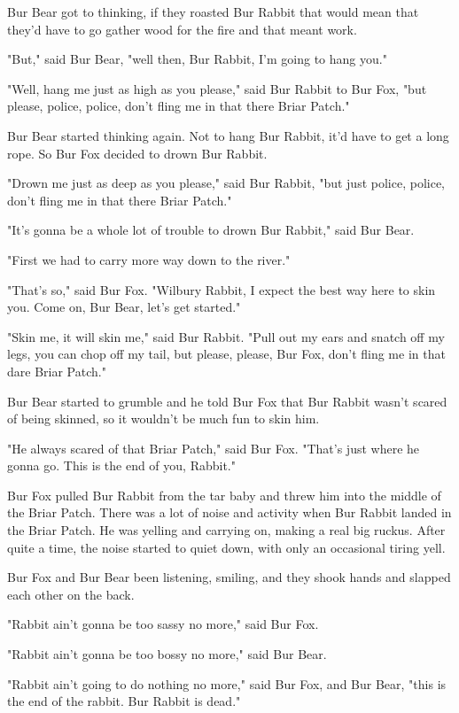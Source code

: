 Bur Bear got to thinking, if they roasted Bur Rabbit that would mean that they'd have to go gather wood for the fire and that meant work.

"But," said Bur Bear, "well then, Bur Rabbit, I'm going to hang you."

"Well, hang me just as high as you please," said Bur Rabbit to Bur Fox, "but please, police, police, don't fling me in that there Briar Patch."

Bur Bear started thinking again. Not to hang Bur Rabbit, it'd have to get a long rope. So Bur Fox decided to drown Bur Rabbit.

"Drown me just as deep as you please," said Bur Rabbit, "but just police, police, don't fling me in that there Briar Patch."

"It's gonna be a whole lot of trouble to drown Bur Rabbit," said Bur Bear.

"First we had to carry more way down to the river."

"That's so," said Bur Fox. "Wilbury Rabbit, I expect the best way here to skin you. Come on, Bur Bear, let's get started."

"Skin me, it will skin me," said Bur Rabbit. "Pull out my ears and snatch off my legs, you can chop off my tail, but please, please, Bur Fox, don't fling me in that dare Briar Patch."

Bur Bear started to grumble and he told Bur Fox that Bur Rabbit wasn't scared of being skinned, so it wouldn't be much fun to skin him.

"He always scared of that Briar Patch," said Bur Fox. "That's just where he gonna go. This is the end of you, Rabbit."

Bur Fox pulled Bur Rabbit from the tar baby and threw him into the middle of the Briar Patch. There was a lot of noise and activity when Bur Rabbit landed in the Briar Patch. He was yelling and carrying on, making a real big ruckus. After quite a time, the noise started to quiet down, with only an occasional tiring yell.

Bur Fox and Bur Bear been listening, smiling, and they shook hands and slapped each other on the back.

"Rabbit ain't gonna be too sassy no more," said Bur Fox.

"Rabbit ain't gonna be too bossy no more," said Bur Bear.

"Rabbit ain't going to do nothing no more," said Bur Fox, and Bur Bear, "this is the end of the rabbit. Bur Rabbit is dead."

